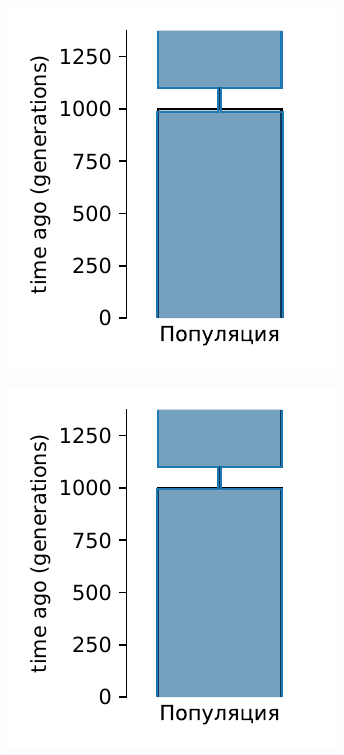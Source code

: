\begin{figure}[ht]
    \centering
    \begin{subfigure}[b]{.33\textwidth}
    \includegraphics[width=\textwidth]{images_experiments/simulation_1/1pop/picture_1pop_model_1_powell_over.pdf}
    \caption{}
    \label{fig:part2:experiments:simulated_1:results_model_1_1}
    \end{subfigure}%
    \begin{subfigure}[b]{.33\textwidth}
    \includegraphics[width=\textwidth]{images_experiments/simulation_1/1pop/picture_1pop_model_1_dadi_pipeline_over.pdf}

\end{subfigure}
\end{figure}
